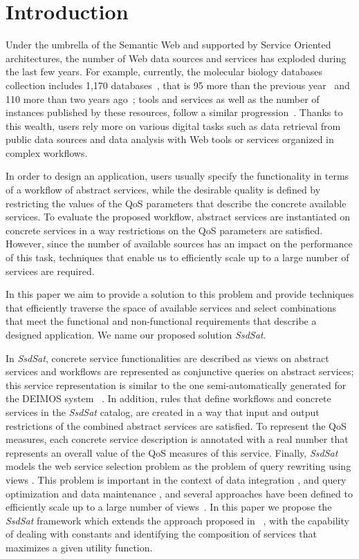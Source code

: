 \documentclass{llncs}
\begin{document}
\section{Introduction}
Under the umbrella of the Semantic Web and supported by Service Oriented architectures, the number of Web data sources and services has exploded during the last few years.  For example,  currently, the molecular biology databases
collection includes 1,170 databases~\cite{Galperin09}, that is
95 more than the previous year~\cite{Galperin2008} and 110 more than two years ago~\cite{Galperin2007};  tools
and services as well as the number of instances published by these resources, follow a similar progression~\cite{Benson07}. Thanks
to this wealth, users rely more on various
digital tasks such as data retrieval from public data sources and
data analysis with Web tools or services organized in
complex workflows.  

In order to design an application, users usually specify the functionality in terms of a workflow of abstract services, while the desirable quality  is defined by restricting the values of the QoS parameters that describe the concrete available services. To evaluate the proposed workflow,  abstract services are instantiated on concrete services in a way restrictions on the QoS parameters are satisfied.  However, since the number of available sources has an impact on the performance of this task, techniques that enable us to efficiently scale up to a large number of services are required. 

In this paper we aim to provide a solution to this problem and provide techniques that efficiently traverse the space of available services and select combinations that meet the functional and non-functional requirements that describe a designed application.  We name our proposed solution {\it SsdSat}. 

In {\it SsdSat}, concrete service functionalities are described as views on abstract services and workflows are represented as conjunctive queries on abstract services; this service representation is similar to the one semi-automatically generated for the {\cal DEIMOS} system ~\cite{AmbiteISWC09}.  In addition, rules that define workflows and  concrete services in the {\it SsdSat} catalog,  are created in a way that input and output restrictions of the combined abstract services are satisfied. To represent the QoS measures, each concrete service description is annotated with a real number that represents an overall value of the QoS measures of this service.  Finally, {\it SsdSat} models the web service selection problem as the problem of query rewriting using views \cite{halevy:survey}. This problem is important in the context of data integration
\cite{Chen05,JaudoinPRST05}, and query optimization and data maintenance \cite{AfratiLU07,levy:bucket}, and several approaches have been defined to efficiently scale up to a large number of views~\cite{arvelo:aaai06,pods:DuschkaG97,sac:DuschkaG97,levy:bucket,pottinger:minicon}. In this paper we propose the {\it SsdSat} framework which extends the approach proposed in ~\cite{arvelo:aaai06},  with the capability of dealing with constants and identifying the composition of services that maximizes a given utility function. 
\end{document}
